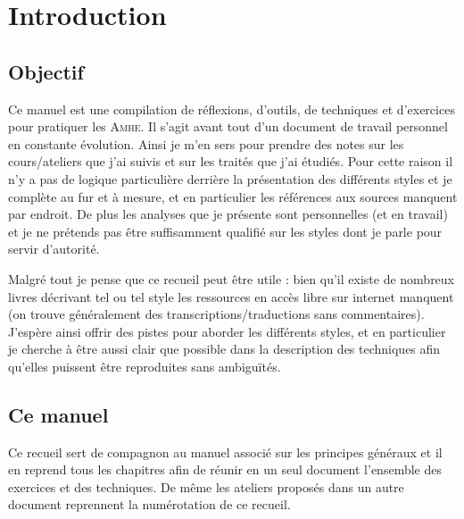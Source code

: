 \chapter{Introduction}


\section{Objectif}



Ce manuel est une compilation de réflexions, d'outils, de techniques et d'exercices pour pratiquer les \textsc{Amhe}.
Il s'agit avant tout d'un document de travail personnel en constante évolution.
Ainsi je m'en sers pour prendre des notes sur les cours/ateliers que j'ai suivis et sur les traités que j'ai étudiés.
Pour cette raison il n'y a pas de logique particulière derrière la présentation des différents styles et je complète au fur et à mesure, et en particulier les références aux sources manquent par endroit.
De plus les analyses que je présente sont personnelles (et en travail) et je ne prétends pas être suffisamment qualifié sur les styles dont je parle pour servir d'autorité.

Malgré tout je pense que ce recueil peut être utile : bien qu'il existe de nombreux livres décrivant tel ou tel style les ressources en accès libre sur internet manquent (on trouve généralement des transcriptions/traductions sans commentaires).
J'espère ainsi offrir des pistes pour aborder les différents styles, et en particulier je cherche à être aussi clair que possible dans la description des techniques afin qu'elles puissent être reproduites sans ambiguïtés.


\section{Ce manuel}


Ce recueil sert de compagnon au manuel associé sur les principes généraux et il en reprend tous les chapitres afin de réunir en un seul document l'ensemble des exercices et des techniques.
De même les ateliers proposés dans un autre document reprennent la numérotation de ce recueil.

